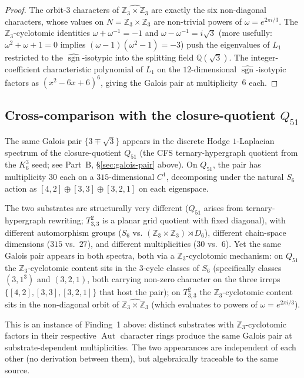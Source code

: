 \documentclass[12pt,a4paper]{article}
\theoremstyle{definition}
\theoremstyle{remark}
\newcommand{\bZ}{\mathbb{Z}}
\newcommand{\bQ}{\mathbb{Q}}                %
\DeclareMathOperator{\Aut}{Aut}
\DeclareMathOperator{\sgn}{sgn}
\begin{document}
\begin{proof}
The orbit-3 characters of $\widehat{\bZ_3 \times \bZ_3}$ are exactly
the six non-diagonal characters, whose values on $N = \bZ_3 \times
\bZ_3$ are non-trivial powers of $\omega = e^{2\pi i / 3}$. The
$\bZ_3$-cyclotomic identities $\omega + \omega^{-1} = -1$ and
$\omega - \omega^{-1} = i\sqrt 3$ (more usefully: $\omega^2 +
\omega + 1 = 0$ implies $(\omega - 1)(\omega^2 - 1) = -3$) push
the eigenvalues of $L_1$ restricted to the $\widehat{\sgn}$-isotypic
into the splitting field $\bQ(\sqrt 3)$. The integer-coefficient
characteristic polynomial of $L_1$ on the $12$-dimensional
$\widehat{\sgn}$-isotypic factors as $(x^2 - 6x + 6)^6$, giving the
Galois pair at multiplicity~$6$ each.
\end{proof}

\subsection{Cross-comparison with the closure-quotient $Q_{51}$}\label{sec:torus-q51}

The same Galois pair $\{3 \mp \sqrt 3\}$ appears in the discrete Hodge
$1$-Laplacian spectrum of the closure-quotient $Q_{51}$ (the CFS
ternary-hypergraph quotient from the $K_6^3$ seed; see Part~B,
\S\ref{sec:galois-pair} above). On $Q_{51}$, the pair has multiplicity $30$
each on a $315$-dimensional $C^1$, decomposing under the natural
$S_6$ action as $[4,2] \oplus [3,3] \oplus [3,2,1]$ on each
eigenspace.

The two substrates are structurally very different ($Q_{51}$ arises from
ternary-hypergraph rewriting; $T^2_{3,3}$ is a planar grid quotient with
fixed diagonal), with different automorphism groups ($S_6$ vs.
$(\bZ_3 \times \bZ_3) \rtimes D_6$), different chain-space dimensions
($315$ vs.\ $27$), and different multiplicities ($30$ vs.\ $6$). Yet
the same Galois pair appears in both spectra, both via a
$\bZ_3$-cyclotomic mechanism: on $Q_{51}$ the $\bZ_3$-cyclotomic content
sits in the $3$-cycle classes of $S_6$ (specifically classes
$(3, 1^3)$ and $(3, 2, 1)$, both carrying non-zero character on the
three irreps $\{[4,2], [3,3], [3,2,1]\}$ that host the pair); on
$T^2_{3,3}$ the $\bZ_3$-cyclotomic content sits in the non-diagonal
orbit of $\widehat{\bZ_3 \times \bZ_3}$ (which evaluates to powers of
$\omega = e^{2\pi i / 3}$).

This is an instance of Finding~1 above: distinct substrates with
$\bZ_3$-cyclotomic factors in their respective $\Aut$ character rings
produce the same Galois pair at substrate-dependent multiplicities.
The two appearances are independent of each other (no derivation between
them), but algebraically traceable to the same source.
\end{document}
